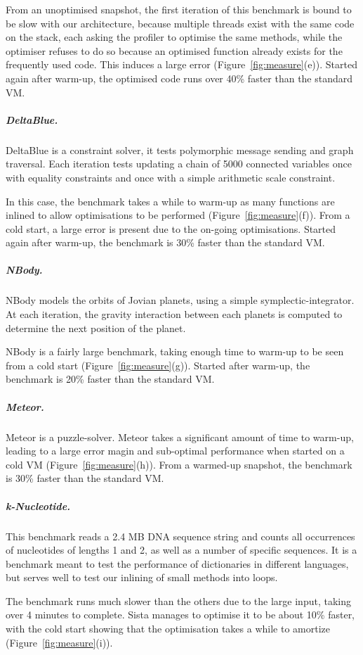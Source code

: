 \documentclass[a4paper,12pt,twoside]{../includes/ThesisStyle}
\begin{document}
From an unoptimised snapshot, the first iteration of this benchmark is bound to be slow with our architecture, because multiple threads exist with the same code on the stack, each asking the profiler to optimise the same methods, while the optimiser refuses to do so because an optimised function already exists for the frequently used code. This induces a large error (Figure~\ref{fig:measure}(e)). Started again after warm-up, the optimised code runs over 40\% faster than the standard VM.

\subparagraph{DeltaBlue.}

DeltaBlue is a constraint solver, it tests polymorphic message sending and graph traversal. Each iteration tests updating a chain of 5000 connected variables once with equality constraints and once with a simple arithmetic scale constraint.

In this case, the benchmark takes a while to warm-up as many functions are inlined to allow optimisations to be performed (Figure~\ref{fig:measure}(f)). From a cold start, a large error is present due to the on-going optimisations. Started again after warm-up, the benchmark is 30\% faster than the standard VM.

\subparagraph{NBody.}

NBody models the orbits of Jovian planets, using a simple symplectic-integrator. At each iteration, the gravity interaction between each planets is computed to determine the next position of the planet.

NBody is a fairly large benchmark, taking enough time to warm-up to be seen from a cold start (Figure~\ref{fig:measure}(g)). Started after warm-up, the benchmark is 20\% faster than the standard VM.

\subparagraph{Meteor.}

Meteor is a puzzle-solver. Meteor takes a significant amount of time to warm-up, leading to a large error magin and sub-optimal performance when started on a cold VM (Figure~\ref{fig:measure}(h)). From a warmed-up snapshot, the benchmark is 30\% faster than the standard VM.

\subparagraph{k-Nucleotide.}

This benchmark reads a 2.4 MB DNA sequence string and counts all occurrences of nucleotides of lengths 1 and 2, as well as a number of specific sequences. It is a benchmark meant to test the performance of dictionaries in different languages, but serves well to test our inlining of small methods into loops.

The benchmark runs much slower than the others due to the large input, taking over 4 minutes to complete. Sista manages to optimise it to be about 10\% faster, with the cold start showing that the optimisation takes a while to amortize (Figure~\ref{fig:measure}(i)).
\end{document}

